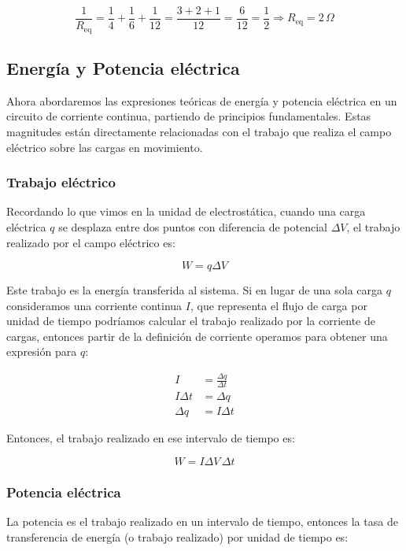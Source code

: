 \[
\frac{1}{R_{\text{eq}}} = \frac{1}{4} + \frac{1}{6} + \frac{1}{12} = \frac{3 + 2 + 1}{12} = \frac{6}{12} = \frac{1}{2}
\Rightarrow R_{\text{eq}} = 2 \, \Omega
\]

\subsection{Energía y Potencia eléctrica}

Ahora abordaremos las expresiones teóricas de energía y potencia eléctrica en un circuito de corriente continua, partiendo de principios fundamentales. Estas magnitudes están directamente relacionadas con el trabajo que realiza el campo eléctrico sobre las cargas en movimiento. 

\subsubsection{Trabajo eléctrico}

Recordando lo que vimos en la unidad de electrostática, cuando una carga eléctrica \( q \) se desplaza entre dos puntos con diferencia de potencial \( \Delta V \), el trabajo realizado por el campo eléctrico es:

\[
W = q \Delta V
\]

Este trabajo es la energía transferida al sistema. Si en lugar de una sola carga \(q\) consideramos una corriente continua \( I \), que representa el flujo de carga por unidad de tiempo podríamos calcular el trabajo realizado por la corriente de cargas, entonces partir de la definición de corriente operamos para obtener una expresión para \(q\):

\begin{align*}
    I &= \frac{\Delta q}{\Delta t} \\
    I \Delta t &= \Delta q \\
    \Delta q &= I \Delta t
\end{align*}

Entonces, el trabajo realizado en ese intervalo de tiempo es:

\begin{equation}
    W = I \Delta V \, \Delta t
    \label{eq:trabajo_electrico}    
\end{equation}

\subsubsection{Potencia eléctrica}

La potencia es el trabajo realizado en un intervalo de tiempo, entonces la tasa de transferencia de energía (o trabajo realizado) por unidad de tiempo es:

